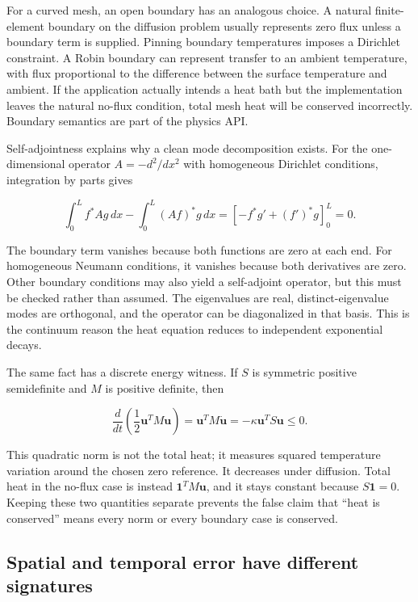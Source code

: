 For a curved mesh, an open boundary has an analogous choice. A natural finite-element boundary on the diffusion problem usually represents zero flux unless a boundary term is supplied. Pinning boundary temperatures imposes a Dirichlet constraint. A Robin boundary can represent transfer to an ambient temperature, with flux proportional to the difference between the surface temperature and ambient. If the application actually intends a heat bath but the implementation leaves the natural no-flux condition, total mesh heat will be conserved incorrectly. Boundary semantics are part of the physics API.

Self-adjointness explains why a clean mode decomposition exists. For the one-dimensional operator \(A=-d^2/dx^2\) with homogeneous Dirichlet conditions, integration by parts gives

\[
\int_0^L f^*Ag\,dx-\int_0^L(Af)^*g\,dx
=\left[-f^*g'+(f')^*g\right]_0^L=0.
\]

The boundary term vanishes because both functions are zero at each end. For homogeneous Neumann conditions, it vanishes because both derivatives are zero. Other boundary conditions may also yield a self-adjoint operator, but this must be checked rather than assumed. The eigenvalues are real, distinct-eigenvalue modes are orthogonal, and the operator can be diagonalized in that basis. This is the continuum reason the heat equation reduces to independent exponential decays.

The same fact has a discrete energy witness. If \(S\) is symmetric positive semidefinite and \(M\) is positive definite, then

\[
\frac{d}{dt}\left(\frac12\mathbf u^TM\mathbf u\right)
=\mathbf u^TM\dot{\mathbf u}
=-\kappa\mathbf u^TS\mathbf u\le0.
\]

This quadratic norm is not the total heat; it measures squared temperature variation around the chosen zero reference. It decreases under diffusion. Total heat in the no-flux case is instead \(\mathbf1^TM\mathbf u\), and it stays constant because \(S\mathbf1=0\). Keeping these two quantities separate prevents the false claim that ``heat is conserved'' means every norm or every boundary case is conserved.

\subsection{Spatial and temporal error have different signatures}\label{04-visual-computing-ii-ch030-spatial-and-temporal-error-have-different-signatures}

